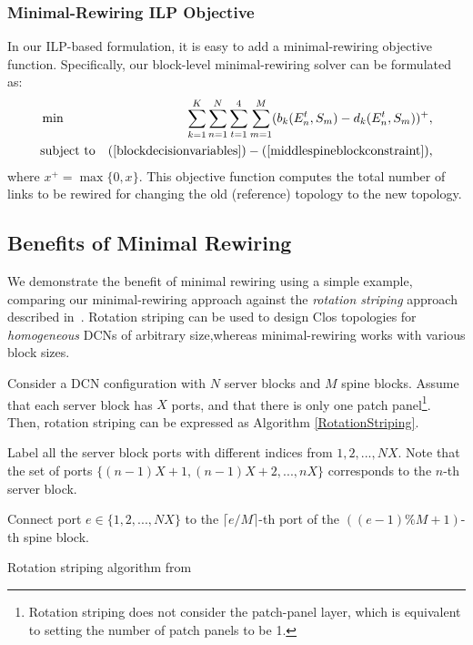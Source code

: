 \documentclass[letterpaper,twocolumn,10pt]{article}
\begin{document}
\subsubsection{Minimal-Rewiring ILP Objective}\label{ObjectiveSection}

In our ILP-based formulation, it is easy to add a minimal-rewiring objective function. Specifically,  our block-level minimal-rewiring solver can be formulated as:
\begin{eqnarray}\label{blocklevelminimalrewiring}
&\min&\sum_{k=1}^K\sum_{n=1}^N\sum_{t=1}^4\sum_{m=1}^M(b_k(E_n^t,S_m)-d_k(E_n^t,S_m))^+, \nonumber\\
&\text{subject to}&(\ref{blockdecisionvariables})-(\ref{middlespineblockconstraint}),
\end{eqnarray}
where $x^+=\max\{0,x\}$. This objective function computes the total number of links to be rewired for changing the old (reference) topology to the new topology.

\subsection{Benefits of Minimal Rewiring}\label{MRbenefitSection}
We demonstrate the benefit of minimal rewiring using a simple example, comparing our minimal-rewiring approach against the \emph{rotation striping} approach described in~\cite{WCMP}. Rotation striping can be used to design Clos topologies for \emph{homogeneous} DCNs of arbitrary size,whereas minimal-rewiring works with various block sizes.

Consider a DCN configuration with $N$ server blocks and  $M$ spine blocks. Assume that each server block has $X$ ports, and that there is only one patch panel\footnote{Rotation striping does not consider the patch-panel layer, which is equivalent to setting the number of patch panels to be 1.}. Then, rotation striping can be expressed as Algorithm \ref{RotationStriping}.

\begin{algorithm}
\small
{}
Label all the server block ports with different indices from $1, 2,..., NX$. Note that the set of ports $\{(n-1)X+1, (n-1)X+2, ..., nX\}$ corresponds to the $n$-th server block.

Connect port $e\in \{1, 2,..., NX\}$ to the $\lceil e/M\rceil$-th port of the $((e-1)\%M + 1)$-th spine block.
\caption{Rotation striping algorithm from ~\cite{WCMP}}\label{RotationStriping}
\end{algorithm}
\end{document}
